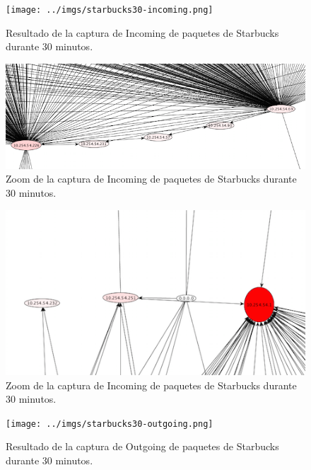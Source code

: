\documentclass[10pt, a4paper]{article}
\begin{document}
\begin{figure}[H] %
\begin{center}
\texttt{[image: ../imgs/starbucks30-incoming.png]}
\caption{Resultado de la captura de Incoming de paquetes de Starbucks durante 30 minutos.}
\end{center}
\end{figure}

\begin{figure}[H] %
\begin{center}
\includegraphics[width=450pt]{../imgs/zoom-starbucks-incoming.png}
\caption{Zoom de la captura de Incoming de paquetes de Starbucks durante 30 minutos.}
\end{center}
\end{figure}

\begin{figure}[H] %
\begin{center}
\includegraphics[width=450pt]{../imgs/zoom-starbucks-incoming2.png}
\caption{Zoom de la captura de Incoming de paquetes de Starbucks durante 30 minutos.}
\end{center}
\end{figure}


\begin{figure}[H] %
\begin{center}
\texttt{[image: ../imgs/starbucks30-outgoing.png]}
\caption{Resultado de la captura de Outgoing de paquetes de Starbucks durante 30 minutos.}
\end{center}
\end{figure}
\end{document}
